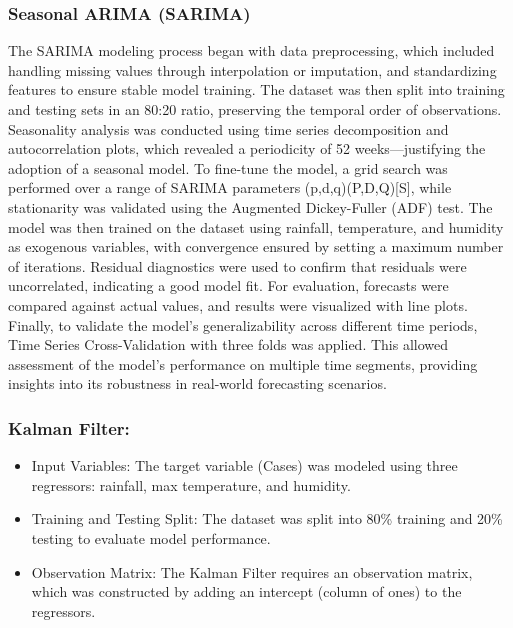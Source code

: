 \subsubsection{Seasonal ARIMA (SARIMA)}

The SARIMA modeling process began with data preprocessing, which included handling missing values through interpolation or imputation, and standardizing features to ensure stable model training. The dataset was then split into training and testing sets in an 80:20 ratio, preserving the temporal order of observations. Seasonality analysis was conducted using time series decomposition and autocorrelation plots, which revealed a periodicity of 52 weeks—justifying the adoption of a seasonal model. To fine-tune the model, a grid search was performed over a range of SARIMA parameters (p,d,q)(P,D,Q)[S], while stationarity was validated using the Augmented Dickey-Fuller (ADF) test. The model was then trained on the dataset using rainfall, temperature, and humidity as exogenous variables, with convergence ensured by setting a maximum number of iterations. Residual diagnostics were used to confirm that residuals were uncorrelated, indicating a good model fit. For evaluation, forecasts were compared against actual values, and results were visualized with line plots. Finally, to validate the model’s generalizability across different time periods, Time Series Cross-Validation with three folds was applied. This allowed assessment of the model’s performance on multiple time segments, providing insights into its robustness in real-world forecasting scenarios.

\subsubsection{Kalman Filter:}
\begin{itemize}
	\item Input Variables: The target variable (Cases) was modeled using three regressors: rainfall, max temperature, and humidity.
	\item Training and Testing Split: The dataset was split into 80\% training and 20\% testing to evaluate model performance.
	\item Observation Matrix: The Kalman Filter requires an observation matrix, which was constructed by adding an intercept (column of ones) to the regressors.
\end{itemize}

